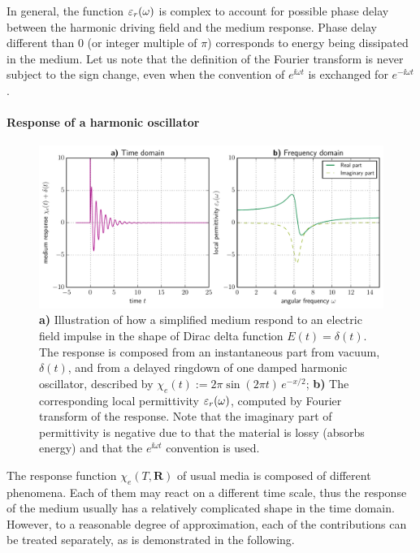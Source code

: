 In general, the function $\varepsilon_r(\omega)$ is complex to account for possible phase delay between the harmonic driving field and the medium response. Phase delay different than $0$ (or integer multiple of $\pi$) corresponds to energy being dissipated in the medium.
Let us note that the definition of the Fourier transform is never subject to the sign change, even when the convention of $e^{\ii \omega t}$ is exchanged for $e^{-\ii \omega t}$.
\paragraph{Response of a harmonic oscillator} \label{chap_lorentzmedia} %
\begin{figure}[t] \caption{\textbf{a)} Illustration of how a simplified medium respond to an electric field impulse in the shape of Dirac delta function  $E(t) = \delta(t)$. The response is composed from an instantaneous part from vacuum, $\delta(t)$, and from a delayed ringdown of one damped harmonic oscillator, described by $\chi_e(t) := 2\pi \sin(2\pi t)\,e^{-x/2}$; \textbf{b)} The corresponding local permittivity $\varepsilon_r(\omega)$, computed by Fourier transform of the response. Note that the imaginary part of permittivity is negative due to that the material is lossy (absorbs energy) and that the $e^{\ii\omega t}$ convention is used.} \label{fg_oscillator_spectrum} \centering 
	\includegraphics[width=\textwidth]{img/oscillator_spectrum.pdf}
\end{figure}
The response function $\chi_e(T, \mathbf{R})$ of usual media is composed of different phenomena.  Each of them may react on a different time scale, thus the response of the medium usually has a relatively complicated shape in the time domain.  However, to a reasonable degree of approximation, each of the contributions can be treated separately, as is demonstrated in the following.

